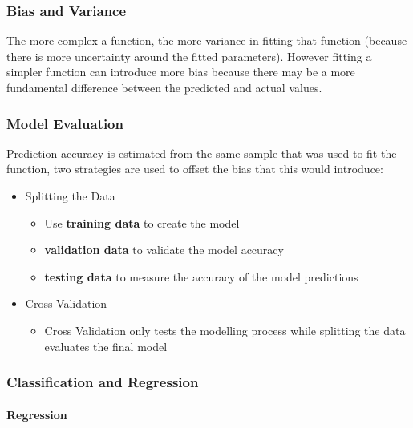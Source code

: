 \documentclass[]{book}
\providecommand{\tightlist}{%
  \setlength{\itemsep}{0pt}\setlength{\parskip}{0pt}}
\let\oldparagraph\paragraph
\renewcommand{\paragraph}[1]{\oldparagraph{#1}\mbox{}}
\begin{document}
\hypertarget{bias-and-variance}{%
\subsubsection{Bias and Variance}\label{bias-and-variance}}

The more complex a function, the more variance in fitting that function (because there is more uncertainty around the fitted parameters).
However fitting a simpler function can introduce more bias because there may be a more fundamental difference between the predicted and actual values.

\hypertarget{model-evaluation}{%
\subsubsection{Model Evaluation}\label{model-evaluation}}

Prediction accuracy is estimated from the same sample that was used to fit the function, two strategies are used to offset the bias that this would introduce:

\begin{itemize}
\tightlist
\item
  Splitting the Data

  \begin{itemize}
  \tightlist
  \item
    Use \textbf{training data} to create the model
  \item
    \textbf{validation data} to validate the model accuracy
  \item
    \textbf{testing data} to measure the accuracy of the model predictions
  \end{itemize}
\item
  Cross Validation

  \begin{itemize}
  \tightlist
  \item
    Cross Validation only tests the modelling process while splitting the data evaluates the final model
  \end{itemize}
\end{itemize}

\hypertarget{classification-and-regression}{%
\subsubsection{Classification and Regression}\label{classification-and-regression}}

\hypertarget{regression}{%
\paragraph{Regression}\label{regression}}
\end{document}
